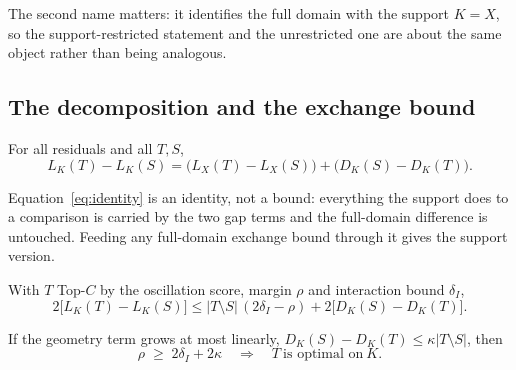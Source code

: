 
The second name matters: it identifies the full domain with the support $K=X$, so the
support-restricted statement and the unrestricted one are about the same object rather
than being analogous.

\subsection{The decomposition and the exchange bound}

\begin{theorem}
\label{thm:decomp}
For all residuals and all $T,S$,
\begin{equation}
L_{K}(T)-L_{K}(S)=\bigl(L_{X}(T)-L_{X}(S)\bigr)+\bigl(D_{K}(S)-D_{K}(T)\bigr).
\label{eq:identity}
\end{equation}
\end{theorem}


Equation~\eqref{eq:identity} is an identity, not a bound: everything the support does to a
comparison is carried by the two gap terms and the full-domain difference is untouched.
Feeding any full-domain exchange bound through it gives the support version.

\begin{theorem}
\label{thm:supportexchange}
With $T$ Top-$C$ by the oscillation score, margin $\rho$ and interaction bound
$\delta_{I}$,
\begin{equation}
2\bigl[L_{K}(T)-L_{K}(S)\bigr]\le|T\setminus S|\,(2\delta_{I}-\rho)
+2\bigl[D_{K}(S)-D_{K}(T)\bigr].
\label{eq:supportexchange}
\end{equation}
\end{theorem}


\begin{corollary}[Threshold]
\label{cor:kappa}
If the geometry term grows at most linearly, $D_{K}(S)-D_{K}(T)\le\kappa|T\setminus S|$,
then
\begin{equation}
\rho\;\ge\;2\delta_{I}+2\kappa\quad\Longrightarrow\quad T\ \text{is optimal on}\ K .
\label{eq:kappathreshold}
\end{equation}
\end{corollary}

